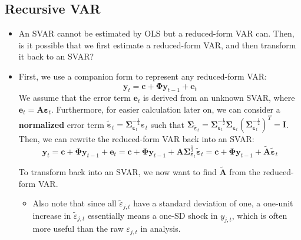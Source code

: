\documentclass[notitlepage]{article}
\begin{document}
\subsection{Recursive VAR}

\begin{itemize}
    \item An SVAR cannot be estimated by OLS but a reduced-form VAR can. Then, is it possible that we first estimate a reduced-form VAR, and then transform it back to an SVAR?

    \item First, we use a companion form to represent any reduced-form VAR:
    \[
    \mathbf{y}_t = \mathbf{c} + \boldsymbol{\Phi}\mathbf{y}_{t-1} + \mathbf{e}_t
    \]
    We assume that the error term \(\mathbf{e}_t\) is derived from an unknown SVAR, where \(\mathbf{e}_t = \mathbf{A}\boldsymbol{\varepsilon}_t\). Furthermore, for easier calculation later on, we can consider a \textbf{normalized} error term \(\tilde{\boldsymbol{\varepsilon}}_t = \boldsymbol{\Sigma}_{\boldsymbol{\varepsilon}_t}^{-\frac{1}{2}}\boldsymbol{\varepsilon}_t\) such that \(\boldsymbol{\Sigma}_{\tilde{\boldsymbol{\varepsilon}}_t} = \boldsymbol{\Sigma}_{\boldsymbol{\varepsilon}_t}^{-\frac{1}{2}} \boldsymbol{\Sigma}_{\boldsymbol{\varepsilon}_t} (\boldsymbol{\Sigma}_{\boldsymbol{\varepsilon}_t}^{-\frac{1}{2}})^T = \mathbf{I}\). Then, we can rewrite the reduced-form VAR back into an SVAR:
        \[
        \mathbf{y}_t = \mathbf{c} + \boldsymbol{\Phi}\mathbf{y}_{t-1} + \mathbf{e}_t = \mathbf{c} + \boldsymbol{\Phi}\mathbf{y}_{t-1} + \mathbf{A} \boldsymbol{\Sigma}_{\boldsymbol{\varepsilon}_t}^\frac{1}{2} \tilde{\boldsymbol{\varepsilon}}_t = \mathbf{c} + \boldsymbol{\Phi}\mathbf{y}_{t-1} + \tilde{\mathbf{A}} \tilde{\boldsymbol{\varepsilon}}_t
        \]

    To transform back into an SVAR, we now want to find \(\tilde{\mathbf{A}}\) from the reduced-form VAR.

    \begin{itemize}
        \item Also note that since all \(\tilde{\varepsilon}_{j,t}\) have a standard deviation of one, a one-unit increase in \(\tilde{\varepsilon}_{j,t}\) essentially means a one-SD shock in \(y_{j,t}\), which is often more useful than the raw \(\varepsilon_{j,t}\) in analysis.
    \end{itemize}
    

\end{itemize}
\end{document}
